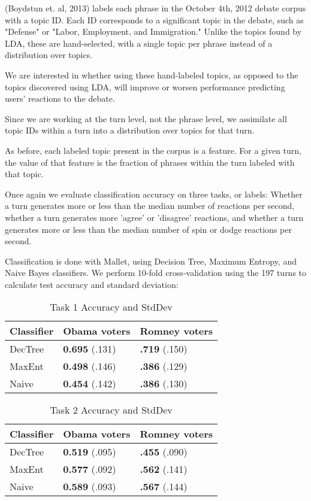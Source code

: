 
(Boydstun et. al, 2013) labels each phrase in the October 4th, 2012 debate corpus with a topic ID. Each ID corresponds to a significant topic in the debate, such as "Defense" or "Labor, Employment, and Immigration." Unlike the topics found by LDA, these are hand-selected, with a single topic per phrase instead of a distribution over topics.

We are interested in whether using these hand-labeled topics, as opposed to the topics discovered using LDA, will improve or worsen performance predicting users' reactions to the debate.

Since we are working at the turn level, not the phrase level, we assimilate all topic IDs within a turn into a distribution over topics for that turn.

As before, each labeled topic present in the corpus is a feature. For a given turn, the value of that feature is the fraction of phrases within the turn labeled with that topic.

Once again we evaluate classification accuracy on three tasks, or labels: Whether a turn generates more or less than the median number of reactions per second, whether a turn generates more 'agree' or 'disagree' reactions, and whether a turn generates more or less than the median number of spin or dodge reactions per second.

Classification is done with Mallet, using Decision Tree, Maximum Entropy, and Naive Bayes classifiers. We perform 10-fold cross-validation using the 197 turns to calculate test accuracy and standard deviation:

\begin{table}[H]
\begin{centering}
\begin{tabular}{ l | l | l }
Classifier & Obama voters & Romney voters \\
\hline
DecTree & \textbf{0.695} (.131) &  \textbf{.719} (.150) \\
MaxEnt & \textbf{0.498} (.146) &  \textbf{.386} (.129) \\
Naive & \textbf{0.454} (.142) &  \textbf{.386} (.130) \\
\end{tabular}
\caption{Task 1 Accuracy and StdDev}
\end{centering}
\end{table}

\begin{table}[H]
\begin{centering}
\begin{tabular}{ l | l | l }
Classifier & Obama voters & Romney voters \\
\hline
DecTree & \textbf{0.519} (.095) &  \textbf{.455} (.090) \\
MaxEnt & \textbf{0.577} (.092) &  \textbf{.562} (.141) \\
Naive & \textbf{0.589} (.093) &  \textbf{.567} (.144) \\
\end{tabular}
\caption{Task 2 Accuracy and StdDev}
\end{centering}
\end{table}


